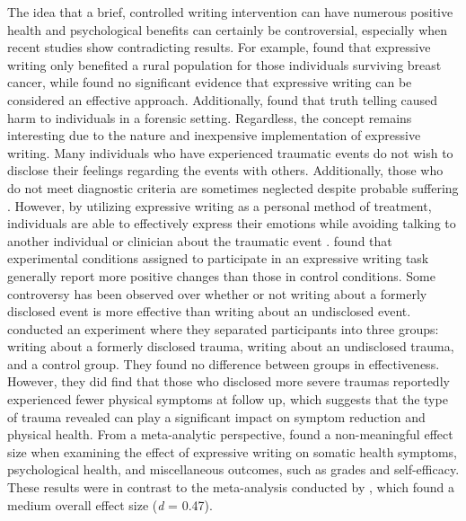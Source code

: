 \documentclass[english,man]{apa6}
\theoremstyle{definition}
\theoremstyle{definition}
\theoremstyle{definition}
\theoremstyle{remark}
\begin{document}
The idea that a brief, controlled writing intervention can have numerous
positive health and psychological benefits can certainly be
controversial, especially when recent studies show contradicting
results. For example, \textcite{Henry2010} found that expressive writing
only benefited a rural population for those individuals surviving breast
cancer, while \textcite{Lancaster2015} found no significant evidence
that expressive writing can be considered an effective approach.
Additionally, \textcite{Brouneus2010} found that truth telling caused
harm to individuals in a forensic setting. Regardless, the concept
remains interesting due to the nature and inexpensive implementation of
expressive writing. Many individuals who have experienced traumatic
events do not wish to disclose their feelings regarding the events with
others. Additionally, those who do not meet diagnostic criteria are
sometimes neglected despite probable suffering \autocite{Wilson2009}.
However, by utilizing expressive writing as a personal method of
treatment, individuals are able to effectively express their emotions
while avoiding talking to another individual or clinician about the
traumatic event \autocite{Smyth1998}. \textcite{Pennebaker1993} found
that experimental conditions assigned to participate in an expressive
writing task generally report more positive changes than those in
control conditions. Some controversy has been observed over whether or
not writing about a formerly disclosed event is more effective than
writing about an undisclosed event. \textcite{Greenberg1992} conducted
an experiment where they separated participants into three groups:
writing about a formerly disclosed trauma, writing about an undisclosed
trauma, and a control group. They found no difference between groups in
effectiveness. However, they did find that those who disclosed more
severe traumas reportedly experienced fewer physical symptoms at follow
up, which suggests that the type of trauma revealed can play a
significant impact on symptom reduction and physical health. From a
meta-analytic perspective, \textcite{Mogk2006} found a non-meaningful
effect size when examining the effect of expressive writing on somatic
health symptoms, psychological health, and miscellaneous outcomes, such
as grades and self-efficacy. These results were in contrast to the
meta-analysis conducted by \textcite{Smyth1998}, which found a medium
overall effect size (\emph{d} = 0.47).
\end{document}
